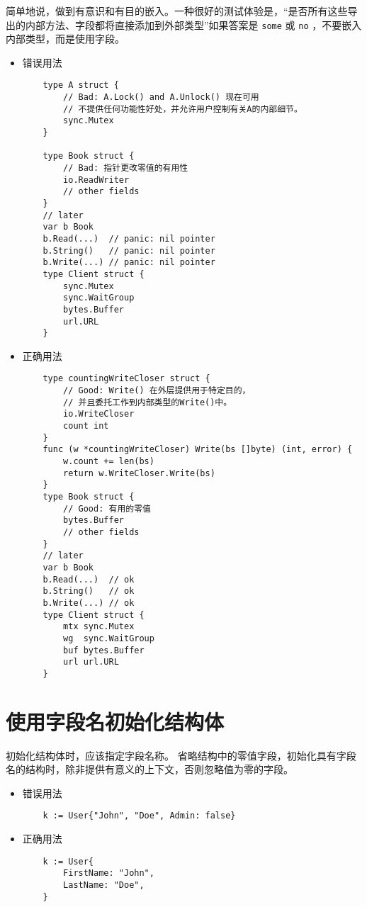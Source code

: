 简单地说，做到有意识和有目的嵌入。一种很好的测试体验是，“是否所有这些导出的内部方法、字段都将直接添加到外部类型”如果答案是 \texttt{some} 或 \texttt{no} ，不要嵌入内部类型，而是使用字段。
\begin{itemize}[leftmargin=4em]
\item 错误用法

  \begin{verbatim}
    type A struct {
    	// Bad: A.Lock() and A.Unlock() 现在可用
    	// 不提供任何功能性好处，并允许用户控制有关A的内部细节。
    	sync.Mutex
    }

    type Book struct {
    	// Bad: 指针更改零值的有用性
    	io.ReadWriter
    	// other fields
    }
    // later
    var b Book
    b.Read(...)  // panic: nil pointer
    b.String()   // panic: nil pointer
    b.Write(...) // panic: nil pointer
    type Client struct {
    	sync.Mutex
    	sync.WaitGroup
    	bytes.Buffer
    	url.URL
    }
  \end{verbatim}
\item 正确用法

  \begin{verbatim}
    type countingWriteCloser struct {
    	// Good: Write() 在外层提供用于特定目的，
    	// 并且委托工作到内部类型的Write()中。
    	io.WriteCloser
    	count int
    }
    func (w *countingWriteCloser) Write(bs []byte) (int, error) {
    	w.count += len(bs)
    	return w.WriteCloser.Write(bs)
    }
    type Book struct {
    	// Good: 有用的零值
    	bytes.Buffer
    	// other fields
    }
    // later
    var b Book
    b.Read(...)  // ok
    b.String()   // ok
    b.Write(...) // ok
    type Client struct {
    	mtx sync.Mutex
    	wg  sync.WaitGroup
    	buf bytes.Buffer
    	url url.URL
    }
  \end{verbatim}
\end{itemize}

\section{使用字段名初始化结构体}
初始化结构体时，应该指定字段名称。
省略结构中的零值字段，初始化具有字段名的结构时，除非提供有意义的上下文，否则忽略值为零的字段。
\begin{itemize}[leftmargin=4em]
\item 错误用法

  \begin{verbatim}
    k := User{"John", "Doe", Admin: false}
  \end{verbatim}
\item 正确用法

  \begin{verbatim}
    k := User{
    	FirstName: "John",
    	LastName: "Doe",
    }
  \end{verbatim}
\end{itemize}

